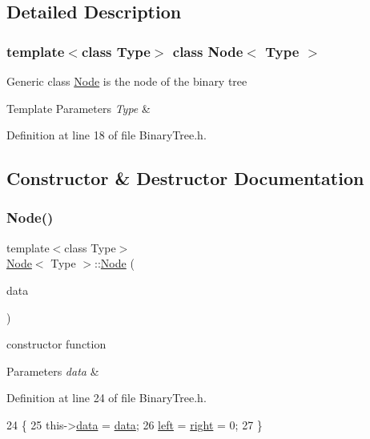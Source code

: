 \subsection{Detailed Description}
\subsubsection*{template$<$class Type$>$\newline
class Node$<$ Type $>$}

Generic class \hyperlink{class_node}{Node} is the node of the binary tree 
\begin{DoxyTemplParams}{Template Parameters}
{\em Type} & \\
\hline
\end{DoxyTemplParams}


Definition at line 18 of file Binary\+Tree.\+h.



\subsection{Constructor \& Destructor Documentation}
\mbox{\label{class_node_a238d6ebbae88f5a39daf8f31ff409164}} 
\subsubsection{\texorpdfstring{Node()}{Node()}\hspace{0.1cm}{\footnotesize\ttfamily [1/2]}}
{\footnotesize\ttfamily template$<$class Type$>$ \\
\hyperlink{class_node}{Node}$<$ Type $>$\+::\hyperlink{class_node}{Node} (\begin{DoxyParamCaption}\item[{Type $\ast$}]{data }\end{DoxyParamCaption})\hspace{0.3cm}{\ttfamily [inline]}}

constructor function 
\begin{DoxyParams}{Parameters}
{\em data} & \\
\hline
\end{DoxyParams}


Definition at line 24 of file Binary\+Tree.\+h.


\begin{DoxyCode}
24                      \{
25         this->\hyperlink{class_node_a8b322cc3cc17b752eb77533493713ddd}{data} = \hyperlink{class_node_a8b322cc3cc17b752eb77533493713ddd}{data};
26         \hyperlink{class_node_abb08a8b3137dd8fc8874348a439e01b4}{left} = \hyperlink{class_node_a34452c0684d3cb1590406ad201b43e65}{right} = 0;
27     \}
\end{DoxyCode}
\mbox{\label{class_node_ab27bbe294970f98f26b5d548dfbb50ca}} 
